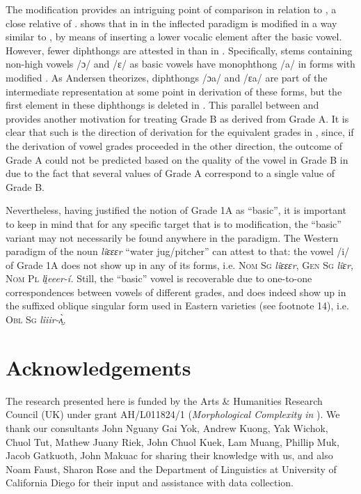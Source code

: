 \documentclass[output=paper,newtxmath,modfonts,nonflat]{langsci/langscibook}
\begin{document}
The  modification provides an intriguing point of comparison in relation to , a close relative of . \citet{Andersen1993} shows that in   in the inflected paradigm is modified in a way similar to , by means of inserting a lower vocalic element after the basic vowel. However, fewer diphthongs are attested in  than in . Specifically, stems containing non-high vowels /ɔ/ and /ɛ/ as basic vowels have monophthong /a/ in forms with modified . As Andersen theorizes, diphthongs /ɔa/ and /ɛa/ are part of the intermediate representation at some point in derivation of these forms, but the first element in these diphthongs is deleted in . This parallel between  and  provides another motivation for treating Grade B as derived from Grade A. It is clear that such is the direction of derivation for the equivalent grades in , since, if the derivation of vowel grades proceeded in the other direction, the outcome of Grade A could not be predicted based on the quality of the vowel in Grade B in  due to the fact that several values of Grade A correspond to a single value of Grade B. 

Nevertheless, having justified the notion of Grade 1A as “basic”, it is important to keep in mind that for any specific target that is  to modification, the “basic” variant may not necessarily be found anywhere in the paradigm. The Western  paradigm of the noun \textit{lîɛɛɛr} “water jug/pitcher” can attest to that: the vowel /i/ of Grade 1A does not show up in any of its forms, i.e. \textsc{Nom Sg} \textit{lîɛɛɛr}, \textsc{Gen Sg} \textit{lîɛr,} \textsc{Nom Pl} \textit{li̤eeer-í.} Still, the “basic” vowel is recoverable due to one-to-one correspondences between vowels of different grades, and does indeed show up in the suffixed oblique singular form used in Eastern  varieties (see footnote 14), i.e. \textsc{Obl Sg} \textit{lîiir-ʌ̤̀}.

\section*{Acknowledgements}

The research presented here is funded by the Arts \& Humanities Research Council (UK) under grant AH/L011824/1 (\textit{Morphological Complexity in }). We thank our  consultants John Nguany Gai Yok, Andrew Kuong, Yak Wichok, Chuol Tut, Mathew Juany Riek, John Chuol Kuek, Lam Muang, Phillip Muk, Jacob Gatkuoth, John Makuac for sharing their knowledge with us, and also Noam Faust, Sharon Rose and the Department of Linguistics at University of California  Diego for their input and assistance with data collection.
\end{document}
